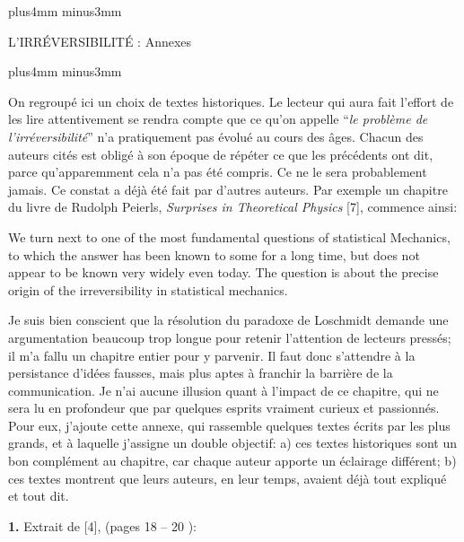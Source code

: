 \null\vskip10mm plus4mm minus3mm

\centerline{\tit L'IRR\'EVERSIBILIT\'E : Annexes}

\vskip10mm plus4mm minus3mm

On regroup\'e ici un choix de textes historiques. Le lecteur qui aura fait 
l'effort de les lire attentivement se rendra compte que ce qu'on appelle 
``{\sl le probl\`eme de l'irr\'eversibilit\'e}'' n'a pratiquement pas 
\'evolu\'e au cours des \^ages. Chacun des auteurs cit\'es est oblig\'e 
\`a son \'epoque de r\'ep\'eter ce que les pr\'ec\'edents ont dit, 
parce qu'apparemment cela n'a pas \'et\'e compris. 
Ce ne le sera probablement jamais.  Ce constat a d\'ej\`a 
\'et\'e fait par d'autres auteurs. Par exemple un chapitre du livre de Rudolph
Peierls, {\it Surprises in Theoretical Physics} [7], commence ainsi:
\medskip
{\cit  We turn next to one of the most fundamental questions of
statistical Mechanics, to which the answer has been known to some for 
a long time, but does not appear to be known very widely even today. 
The question is about the precise origin of the irreversibility in 
statistical mechanics. 
\smallskip
{}\par  }
\medskip
Je suis bien conscient que la r\'esolution du {\og paradoxe de Loschmidt\fg}
demande une argumentation beaucoup trop longue pour retenir l'attention de
lecteurs press\'es;  il m'a fallu un chapitre entier pour y parvenir. 
Il faut donc s'attendre \`a la persistance d'id\'ees fausses,  mais plus aptes
\`a franchir la barri\`ere de la communication.  Je n'ai aucune illusion
quant \`a l'impact de ce chapitre,  qui ne sera lu en profondeur que par
quelques esprits vraiment curieux et passionn\'es.  Pour eux,  j'ajoute
cette annexe,  qui rassemble quelques textes \'ecrits par les plus grands, 
et \`a laquelle j'assigne un double objectif:
\smallskip
a) ces textes historiques sont un bon compl\'ement au chapitre, 
car chaque auteur apporte un \'eclairage diff\'erent; 
\smallskip
b) ces textes montrent que leurs auteurs,  en leur temps,  avaient d\'ej\`a
tout expliqu\'e et tout dit. 

\bigskip

{\bf 1.}\hskip3mm Extrait de [4], (pages 18 -- 20 ):
\medskip
\def\ttv{\vrule height 56pt}

